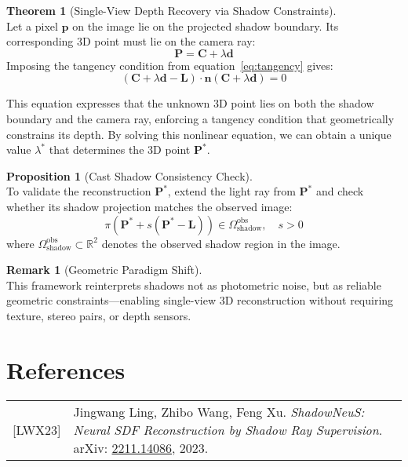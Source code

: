 \documentclass[12pt]{article}
\newcommand{\R}{\mathbb{R}}
\newcommand{\vect}[1]{\bm{#1}}
\theoremstyle{definition}
\newtheorem{theorem}{Theorem}[section]
\newtheorem{proposition}{Proposition}[section]
\newtheorem{remark}{Remark}[section]
\begin{document}
\begin{theorem}[Single-View Depth Recovery via Shadow Constraints] ~\\
Let a pixel $\vect{p}$ on the image lie on the projected shadow boundary. Its corresponding 3D point must lie on the camera ray:
\begin{equation}
\vect{P} = \vect{C} + \lambda \vect{d}
\end{equation}
Imposing the tangency condition from equation~\eqref{eq:tangency} gives:
\begin{equation}
\boxed{(\vect{C} + \lambda \vect{d} - \vect{L}) \cdot \vect{n}(\vect{C} + \lambda \vect{d}) = 0} \label{eq:shadow_constraint}
\end{equation}
\end{theorem}

This equation expresses that the unknown 3D point lies on both the shadow boundary and the camera ray, enforcing a tangency condition that geometrically constrains its depth. By solving this nonlinear equation, we can obtain a unique value $\lambda^*$ that determines the 3D point $\vect{P}^*$.

\begin{proposition}[Cast Shadow Consistency Check] ~\\
To validate the reconstruction $\vect{P}^*$, extend the light ray from $\vect{P}^*$ and check whether its shadow projection matches the observed image:
\begin{equation}
\boxed{
\pi(\vect{P}^* + s(\vect{P}^* - \vect{L})) \in \Omega_{\text{shadow}}^{\text{obs}}, \quad s > 0
}
\end{equation}
where $\Omega_{\text{shadow}}^{\text{obs}} \subset \R^2$ denotes the observed shadow region in the image.
\end{proposition}

\begin{remark}[Geometric Paradigm Shift] ~\\
This framework reinterprets shadows not as photometric noise, but as reliable geometric constraints—enabling single-view 3D reconstruction without requiring texture, stereo pairs, or depth sensors.
\end{remark}

















\newpage

\section*{References}
\begin{tabular}{@{}p{} p{}}
{[LWX23]} & Jingwang Ling, Zhibo Wang, Feng Xu. \textit{ShadowNeuS: Neural SDF Reconstruction by Shadow Ray Supervision}. arXiv: \href{https://arxiv.org/abs/2211.14086}{2211.14086}, 2023.
\end{tabular}
\end{document}
